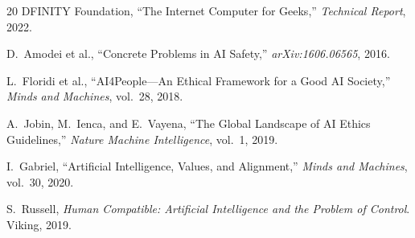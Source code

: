 \documentclass[11pt,twocolumn]{article}
\begin{document}
\begin{thebibliography}{20}
DFINITY Foundation, ``The Internet Computer for Geeks,'' \textit{Technical
Report}, 2022.

D.~Amodei et al., ``Concrete Problems in AI Safety,''
\textit{arXiv:1606.06565}, 2016.

L.~Floridi et al., ``AI4People---An Ethical Framework for a Good AI Society,''
\textit{Minds and Machines}, vol.~28, 2018.

A.~Jobin, M.~Ienca, and E.~Vayena, ``The Global Landscape of AI Ethics
Guidelines,'' \textit{Nature Machine Intelligence}, vol.~1, 2019.

I.~Gabriel, ``Artificial Intelligence, Values, and Alignment,''
\textit{Minds and Machines}, vol.~30, 2020.

S.~Russell, \textit{Human Compatible: Artificial Intelligence and the Problem
of Control}. Viking, 2019.

\end{thebibliography}
\end{document}
